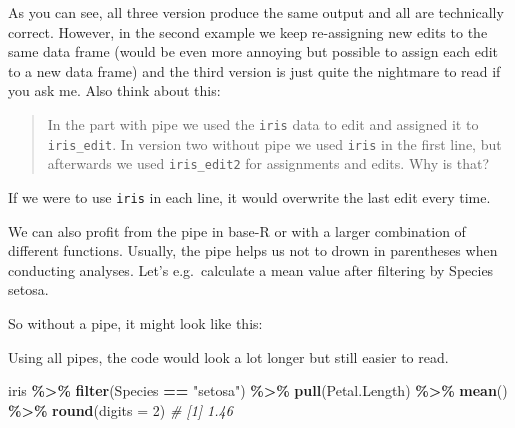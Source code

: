 \documentclass[
]{book}
\newenvironment{Shaded}{\begin{snugshade}}{\end{snugshade}}
\newcommand{\AttributeTok}[1]{\textcolor[rgb]{0.13,0.29,0.53}{#1}}
\newcommand{\CommentTok}[1]{\textcolor[rgb]{0.56,0.35,0.01}{\textit{#1}}}
\newcommand{\DecValTok}[1]{\textcolor[rgb]{0.00,0.00,0.81}{#1}}
\newcommand{\FunctionTok}[1]{\textcolor[rgb]{0.13,0.29,0.53}{\textbf{#1}}}
\newcommand{\NormalTok}[1]{#1}
\newcommand{\SpecialCharTok}[1]{\textcolor[rgb]{0.81,0.36,0.00}{\textbf{#1}}}
\newcommand{\StringTok}[1]{\textcolor[rgb]{0.31,0.60,0.02}{#1}}
\begin{document}
As you can see, all three version produce the same output and all are technically correct.
However, in the second example we keep re-assigning new edits to the same data frame (would be even more annoying but possible to assign each edit to a new data frame) and the third version is just quite the nightmare to read if you ask me.
Also think about this:

\begin{quote}
In the part with pipe we used the \texttt{iris} data to edit and assigned it to \texttt{iris\_edit}.
In version two without pipe we used \texttt{iris} in the first line, but afterwards we used \texttt{iris\_edit2} for assignments and edits.
Why is that?
\end{quote}

If we were to use \texttt{iris} in each line, it would overwrite the last edit every time.

We can also profit from the pipe in base-R or with a larger combination of different functions.
Usually, the pipe helps us not to drown in parentheses when conducting analyses.
Let's e.g.~calculate a mean value after filtering by Species setosa.

So without a pipe, it might look like this:

\begin{Shaded}
\end{Shaded}

Using all pipes, the code would look a lot longer but still easier to read.

\begin{Shaded}
\begin{Highlighting}[]
\NormalTok{iris }\SpecialCharTok{\%\textgreater{}\%} 
\FunctionTok{filter}\NormalTok{(Species }\SpecialCharTok{==} \StringTok{"setosa"}\NormalTok{) }\SpecialCharTok{\%\textgreater{}\%} 
\FunctionTok{pull}\NormalTok{(Petal.Length) }\SpecialCharTok{\%\textgreater{}\%}
\FunctionTok{mean}\NormalTok{() }\SpecialCharTok{\%\textgreater{}\%} \FunctionTok{round}\NormalTok{(}\AttributeTok{digits =} \DecValTok{2}\NormalTok{)}
\CommentTok{\# [1] 1.46}
\end{Highlighting}
\end{Shaded}
\end{document}
